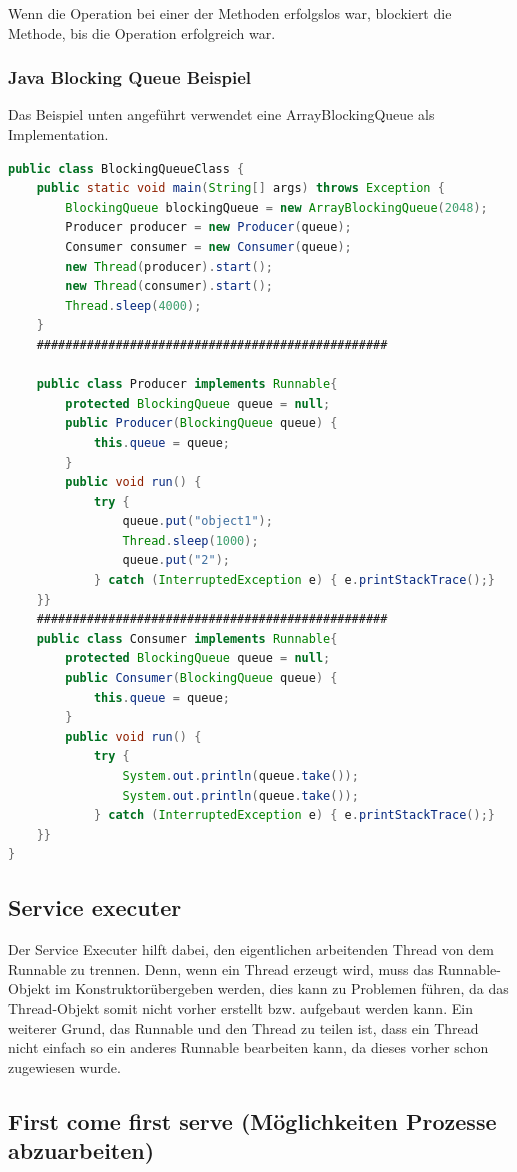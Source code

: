Wenn die Operation bei einer der Methoden erfolgslos war, blockiert die Methode, bis die Operation erfolgreich war. 

\subsubsection{Java Blocking Queue Beispiel}
Das Beispiel unten angeführt verwendet eine ArrayBlockingQueue als Implementation. 



\begin{lstlisting}[language=java,caption=Java BlockingQueue Beispiel,label=lst:impl:blockingQueue]
    public class BlockingQueueClass {
    public static void main(String[] args) throws Exception {
        BlockingQueue blockingQueue = new ArrayBlockingQueue(2048);
        Producer producer = new Producer(queue);
        Consumer consumer = new Consumer(queue);
        new Thread(producer).start();
        new Thread(consumer).start();
        Thread.sleep(4000);
    }
    #################################################

    public class Producer implements Runnable{
        protected BlockingQueue queue = null;
        public Producer(BlockingQueue queue) {
            this.queue = queue;
        }
        public void run() {
            try {
                queue.put("object1");
                Thread.sleep(1000);
                queue.put("2");
            } catch (InterruptedException e) { e.printStackTrace();}
    }}
    #################################################
    public class Consumer implements Runnable{
        protected BlockingQueue queue = null;
        public Consumer(BlockingQueue queue) {
            this.queue = queue;
        }
        public void run() {
            try {
                System.out.println(queue.take());
                System.out.println(queue.take());
            } catch (InterruptedException e) { e.printStackTrace();}
    }}
}
\end{lstlisting}

\subsection{Service executer}
Der Service Executer hilft dabei, den eigentlichen arbeitenden Thread von dem Runnable zu trennen. Denn, wenn ein Thread erzeugt wird, muss das Runnable-Objekt im Konstruktorübergeben werden, dies kann zu Problemen führen, da das Thread-Objekt somit nicht vorher erstellt bzw. aufgebaut werden kann. Ein weiterer Grund, das Runnable und den Thread zu teilen ist, dass ein Thread nicht einfach so ein anderes Runnable bearbeiten kann, da dieses vorher schon zugewiesen wurde. 



\subsection{First come first serve (Möglichkeiten Prozesse abzuarbeiten)}
